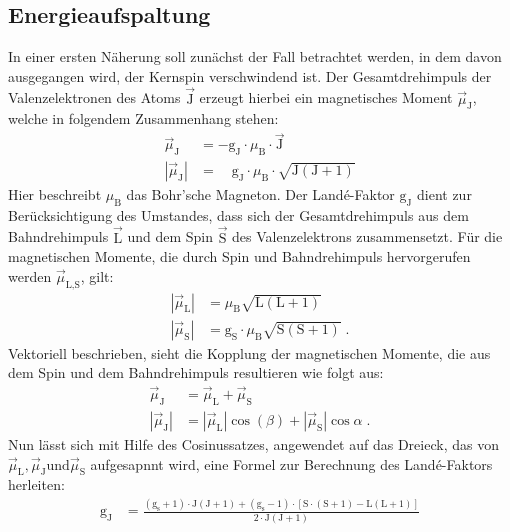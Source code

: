 \subsection{Energieaufspaltung}
In einer ersten Näherung soll zunächst der Fall betrachtet werden, in dem davon ausgegangen wird, der
Kernspin verschwindend ist.
Der Gesamtdrehimpuls der Valenzelektronen des Atoms $\vec{\text{J}}$ erzeugt hierbei
ein magnetisches Moment $\vec{\mu}_{\text{J}}$, welche in folgendem Zusammenhang stehen:
\begin{align*}
    \vec{\mu}_{\text{J}} &= -\text{g}_{\text{J}} \cdot \mu_{\text{B}} \cdot \vec{\text{J}} \\
    |\vec{\mu}_{\text{J}}| &= \hspace{1em} \text{g}_{\text{J}} \cdot \mu_{\text{B}} \cdot \sqrt{ \text{J} (\text{J}+1) }
\end{align*}
Hier beschreibt $\mu_{\text{B}}$ das Bohr'sche Magneton.
Der Landé-Faktor $\text{g}_{\text{J}}$ dient zur Berücksichtigung des Umstandes, dass sich der Gesamtdrehimpuls aus dem Bahndrehimpuls $\vec{\text{L}}$ und dem Spin $\vec{\text{S}}$ des Valenzelektrons zusammensetzt.
Für die magnetischen Momente, die durch Spin und Bahndrehimpuls hervorgerufen werden $\vec{\mu}_{\text{L,S}}$, gilt:
\begin{align*}
    |\vec{\mu}_{\text{L}}| &= \mu_{\text{B}} \sqrt{\text{L} (\text{L}+1)} \\
    |\vec{\mu}_{\text{S}}| &= \text{g}_{\text{S}} \cdot \mu_{\text{B}} \sqrt{\text{S}(\text{S}+1)} \; .
\end{align*}
Vektoriell beschrieben, sieht die Kopplung der magnetischen Momente, die aus dem Spin und dem Bahndrehimpuls resultieren wie folgt aus:
\begin{align*}
    \vec{\mu}_{\text{J}} &= \vec{\mu}_{\text{L}} + \vec{\mu}_{\text{S}} \\
    |\vec{\mu}_{\text{J}}| &= |\vec{\mu}_{\text{L}}| \cos(\beta) + |\vec{\mu}_{\text{S}}| \cos{\alpha} \; .
\end{align*}
Nun lässt sich mit Hilfe des Cosinussatzes, angewendet auf das Dreieck, das von $\vec{\mu}_{\text{L}}, \vec{\mu}_{\text{J}} \text{und} \vec{\mu}_{\text{S}}$ aufgesapnnt wird, eine Formel zur Berechnung des Landé-Faktors herleiten:
\begin{align}
    \text{g}_{\text{J}} &= \frac{(\text{g}_{\text{s}} + 1) \cdot \text{J} (\text{J} + 1) + (\text{g}_{\text{s}}-1) \cdot \left[\text{S}
    \cdot (\text{S}+1) - \text{L} (\text{L} + 1) \right]}{2 \cdot \text{J} (\text{J} +1 )}
    \label{eq:La-Fa.gj}
\end{align}
